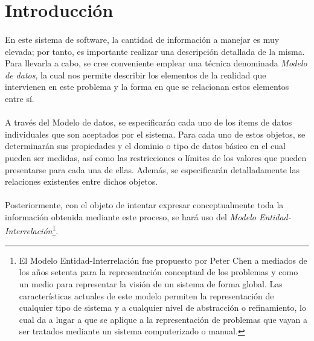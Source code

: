 \section{Introducción}

   \paragraph{}En este sistema de software, la cantidad de información a manejar
   es muy elevada; por tanto, es importante realizar una descripción detallada
   de la misma. Para llevarla a cabo, se cree conveniente emplear una técnica
   denominada \textit{Modelo de datos}, la cual nos permite describir los
   elementos de la realidad que intervienen en este problema y la forma en que
   se relacionan estos elementos entre sí.

   \paragraph{}A través del Modelo de datos, se especificarán cada uno de los
   ítems de datos individuales que son aceptados por el sistema. Para cada uno
   de estos objetos, se determinarán sus propiedades y el dominio o tipo de
   datos básico en el cual pueden ser medidas, así como las restricciones o
   límites de los valores que pueden presentarse para cada una de ellas.
   Además, se especificarán detalladamente las relaciones existentes entre
   dichos objetos.

   \paragraph{}Posteriormente, con el objeto de intentar expresar
   conceptualmente toda la información obtenida mediante este proceso, se hará
   uso del \textit{Modelo Entidad-Interrelación}\footnote{El Modelo
   Entidad-Interrelación fue propuesto por Peter Chen a mediados de los años
   setenta para la representación conceptual de los problemas y como un medio
   para representar la visión de un sistema de forma global. Las características
   actuales de este modelo permiten la representación de cualquier tipo de
   sistema y a cualquier nivel de abstracción o refinamiento, lo cual da a lugar
   a que se aplique a la representación de problemas que vayan a ser
   tratados mediante un sistema computerizado o manual.}.
